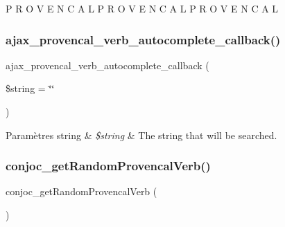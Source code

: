 P R O V E N C A L P R O V E N C A L P R O V E N C A L \hypertarget{php_2conjoc__provencal__web_form_8inc_a2f2da1c5cc327e80252b73dd250aa363}{}\label{php_2conjoc__provencal__web_form_8inc_a2f2da1c5cc327e80252b73dd250aa363} 
\subsubsection{\texorpdfstring{ajax\+\_\+provencal\+\_\+verb\+\_\+autocomplete\+\_\+callback()}{ajax\_provencal\_verb\_autocomplete\_callback()}}
{\footnotesize\ttfamily ajax\+\_\+provencal\+\_\+verb\+\_\+autocomplete\+\_\+callback (\begin{DoxyParamCaption}\item[{}]{\$string = {\ttfamily \char`\"{}\char`\"{}} }\end{DoxyParamCaption})}


\begin{DoxyParams}[1]{Paramètres}
string & {\em \$string} & The string that will be searched. \\
\hline
\end{DoxyParams}
\hypertarget{php_2conjoc__provencal__web_form_8inc_a8e95bdf8c2d2a450e6485d589788aa83}{}\label{php_2conjoc__provencal__web_form_8inc_a8e95bdf8c2d2a450e6485d589788aa83} 
\subsubsection{\texorpdfstring{conjoc\+\_\+get\+Random\+Provencal\+Verb()}{conjoc\_getRandomProvencalVerb()}}
{\footnotesize\ttfamily conjoc\+\_\+get\+Random\+Provencal\+Verb (\begin{DoxyParamCaption}{ }\end{DoxyParamCaption})}

